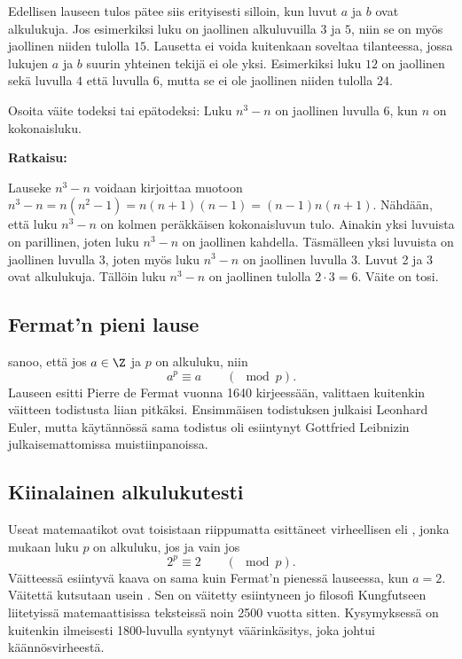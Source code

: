 Edellisen lauseen tulos pätee siis erityisesti silloin, kun luvut $a$ ja $b$ ovat alkulukuja. Jos esimerkiksi luku on jaollinen alkuluvuilla $3$ ja $5$, niin se on myös jaollinen niiden tulolla $15$. Lausetta ei voida kuitenkaan soveltaa tilanteessa, jossa lukujen $a$ ja $b$ suurin yhteinen tekijä ei ole yksi. Esimerkiksi luku $12$ on jaollinen sekä luvulla $4$ että luvulla $6$, mutta se ei ole jaollinen niiden tulolla $24$.

\begin{esimerkki}
Osoita väite todeksi tai epätodeksi: Luku $n^3 - n$ on jaollinen luvulla $6$, kun $n$ on
kokonaisluku.


{\bf Ratkaisu:}

Lauseke $n^3 - n$ voidaan kirjoittaa muotoon $n^3 - n = n(n^2
- 1) = n(n + 1)(n - 1) = (n - 1)n(n + 1)$. Nähdään, että luku
$n^3 - n$ on kolmen peräkkäisen kokonaisluvun tulo. Ainakin
yksi luvuista on parillinen, joten luku $n^3 - n$ on jaollinen
kahdella. Täsmälleen yksi luvuista on jaollinen luvulla $3$,
joten myös luku $n^3 - n$ on jaollinen luvulla $3$. Luvut 2 ja
3 ovat alkulukuja. Tällöin luku $n^3 - n$ on jaollinen tulolla
$2 \cdot 3 = 6$. Väite on tosi.
\end{esimerkki}

\subsection*{Fermat'n pieni lause}  sanoo, että jos $a\in\Z$ ja $p$ on alkuluku, niin 
\[
a^p \equiv a \qquad (\mod p).
\]
Lauseen esitti Pierre de Fermat vuonna 1640 kirjeessään, valittaen kuitenkin väitteen todistusta liian pitkäksi. Ensimmäisen todistuksen julkaisi Leonhard Euler, mutta käytännössä sama todistus oli esiintynyt Gottfried Leibnizin julkaisemattomissa muistiinpanoissa.

\subsection*{Kiinalainen alkulukutesti}
Useat matemaatikot ovat toisistaan riippumatta esittäneet virheellisen  eli , jonka mukaan luku $p$ on alkuluku, jos ja vain jos
\[
2^p \equiv 2 \qquad (\mod p).
\]
Väitteessä esiintyvä kaava on sama kuin Fermat'n pienessä lauseessa, kun $a=2$. Väitettä kutsutaan usein . Sen on väitetty esiintyneen jo filosofi Kungfutseen liitetyissä matemaattisissa teksteissä noin 2500 vuotta sitten. Kysymyksessä on kuitenkin ilmeisesti 1800-luvulla syntynyt väärinkäsitys, joka johtui  kään\-nös\-vir\-hees\-tä.

